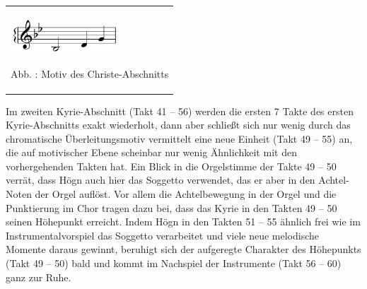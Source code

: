 \begin{center}
\begin{minipage}{4.394cm}
\begin{flushleft}
\tablefirsthead{}
\tablehead{}
\tabletail{}
\tablelasttail{}
\begin{supertabular}{m{4.1940002cm}}

\includegraphics[width=4.011cm,height=1.378cm]{pictures/zulassungsarbeit-img119.png}

Abb. : Motiv des Christe-Abschnitts\\
\end{supertabular}
\end{flushleft}
\end{minipage}
\end{center}
Im zweiten Kyrie-Abschnitt (Takt 41 – 56) werden die ersten 7 Takte des
ersten Kyrie-Abschnitts exakt wiederholt, dann aber schließt sich nur
wenig durch das chromatische Überleitungsmotiv vermittelt eine neue
Einheit (Takt 49 – 55) an, die auf motivischer Ebene scheinbar nur
wenig Ähnlichkeit mit den vorhergehenden Takten hat. Ein Blick in die
Orgelstimme der Takte 49 – 50 verrät, dass Högn auch hier das Soggetto
verwendet, das er aber in den Achtel-Noten der Orgel auflöst. Vor allem
die Achtelbewegung in der Orgel und die Punktierung im Chor tragen dazu
bei, dass das Kyrie in den Takten 49 – 50 seinen Höhepunkt erreicht.
Indem Högn in den Takten 51 – 55 ähnlich frei wie im
Instrumentalvorspiel das Soggetto verarbeitet und viele neue melodische
Momente daraus gewinnt, beruhigt sich der aufgeregte Charakter des
Höhepunkts (Takt 49 – 50) bald und kommt im Nachspiel der Instrumente
(Takt 56 – 60) ganz zur Ruhe.

